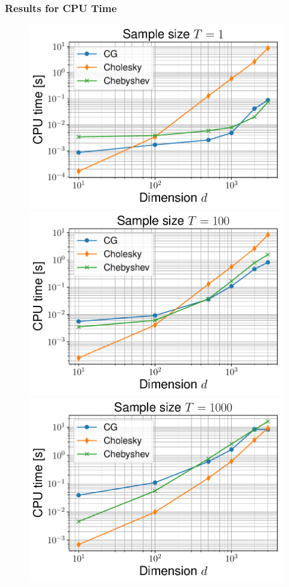 \documentclass[aspectratio=169]{beamer}
\begin{document}
\begin{frame}
\frametitle{Results for CPU Time}
\begin{figure}
    \centering
    \mbox{{\includegraphics[scale=0.33]{src/images/simu1_ex1_time_1.pdf}}}
    \mbox{{\includegraphics[scale=0.33]{src/images/simu1_ex1_time_100.pdf}}}
    \mbox{{\includegraphics[scale=0.33]{src/images/simu1_ex1_time_1000.pdf}}}

\end{figure}
\end{frame}
\end{document}

